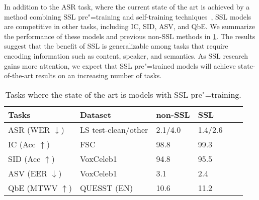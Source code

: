In addition to the ASR task, where the current state of the art is achieved by a method
combining SSL pre"=training and self-training 
techniques~\parencite{zhang_pushing_2020}, SSL models are competitive in other tasks, including IC,
SID, ASV, and QbE. We summarize the performance of these models and previous
non-SSL methods in \cref{table:sota_performance}. The results suggest that the
benefit of SSL is generalizable among tasks that require encoding 
information such as content, speaker, and semantics. As SSL research
gains more attention, we expect that SSL pre"=trained models will 
achieve state-of-the-art results on an increasing number of tasks.

\begin{table}[t]
  \centering
  \footnotesize
  \caption{Tasks where the state of the art is models with SSL pre"=training.}
  \label{table:sota_performance}
  \renewcommand*\arraystretch{1.2}
  \begin{tabular}{llllll}  
    \toprule
    Tasks & Dataset & non-SSL & SSL \\
    \midrule
    ASR (WER $\downarrow$) & LS test-clean/other & 2.1/4.0 \parencite{xu_iterative_2020} & 1.4/2.6 \parencite{zhang_pushing_2020} \\ \hline
    IC (Acc $\uparrow$) & FSC & 98.8 \parencite{lugosch_speech_2019} & 99.3\parencite{chen_unispeechsat_2021} \\ \hline
    SID (Acc $\uparrow$) & VoxCeleb1 & 94.8 \parencite{hajibabaei_unified_2018} & 95.5 \parencite{chen_wavlm_2021} \\ \hline
    ASV (EER $\downarrow$) & VoxCeleb1 & 3.1 \parencite{hajavi_siamese_2021} & 2.4 \parencite{wang_finetuned_2021} \\ \hline
    QbE (MTWV $\uparrow$) & QUESST (EN) & 10.6 \parencite{rodriguez-fuentes_gttsehu_2014} & 11.2\parencite{chen_unispeechsat_2021} \\
    \bottomrule
  \end{tabular}
\end{table}


